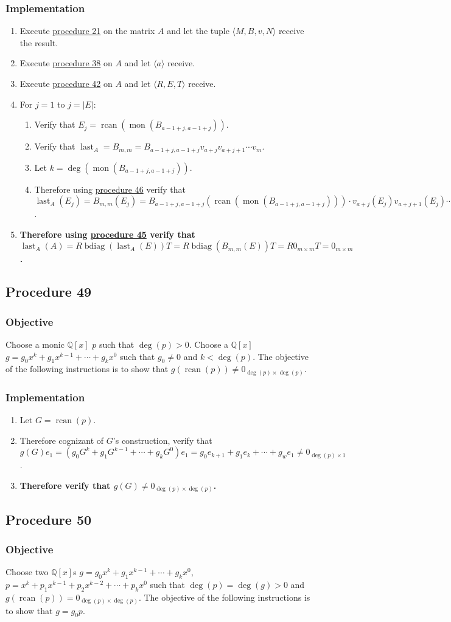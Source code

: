 \documentclass[twocolumn]{article}
\DeclareMathOperator{\bdiag}{bdiag}
\DeclareMathOperator{\rcan}{rcan}
\DeclareMathOperator{\mon}{mon}
\DeclareMathOperator{\last}{last}
\newcommand{\procedure}[2][]{\subsection*{Procedure #2 \ifthenelse{\equal{#1}{}}{}{(#1)}}\label{sec:procedure #2}}
\newcommand{\objective}{\subsubsection*{Objective}}
\newcommand{\implementation}{\subsubsection*{Implementation}}
\begin{document}
			\implementation
				\begin{enumerate}
					\item Execute \hyperref[sec:procedure 21]{procedure 21} on the matrix $A$ and let the tuple $\langle M,B,v,N\rangle$ receive the result.
					\item Execute \hyperref[sec:procedure 38]{procedure 38} on $A$ and let $\langle a\rangle$ receive.
					\item Execute \hyperref[sec:procedure 42]{procedure 42} on $A$ and let $\langle R,E,T\rangle$ receive.
					\item For $j=1$ to $j=\lvert E\rvert$:
					\begin{enumerate}
						\item Verify that $E_j=\rcan(\mon(B_{a-1+j,a-1+j}))$.
						\item Verify that $\last_A=B_{m,m}=B_{a-1+j,a-1+j}v_{a+j}v_{a+j+1}\cdots v_m$.
						\item Let $k=\deg(\mon(B_{a-1+j,a-1+j}))$.
						\item Therefore using \hyperref[sec:procedure 46]{procedure 46} verify that $\last_A(E_j)=B_{m,m}(E_j)=B_{a-1+j,a-1+j}(\rcan(\mon(B_{a-1+j,a-1+j})))\cdot v_{a+j}(E_j)v_{a+j+1}(E_j)\cdots v_m(E_j)=0_{k\times k}v_{a+j}(E_j)v_{a+j+1}(E_j)\cdots v_m(E_j)=0_{k\times k}$.
					\end{enumerate}
					\item \textbf{Therefore using \hyperref[sec:procedure 45]{procedure 45} verify that $\last_A(A)=R\bdiag(\last_A(E))T=R\bdiag(B_{m,m}(E))T=R0_{m\times m}T=0_{m\times m}$.}
				\end{enumerate}
		\procedure{49}
			\objective
				Choose a monic $\mathbb{Q}[x]$ $p$ such that $\deg(p)>0$. Choose a $\mathbb{Q}[x]$ $g=g_0x^k+g_1x^{k-1}+\cdots+g_kx^0$ such that $g_0\ne 0$ and $k<\deg(p)$. The objective of the following instructions is to show that $g(\rcan(p))\ne 0_{\deg(p)\times \deg(p)}$.
			\implementation
				\begin{enumerate}
					\item Let $G=\rcan(p)$.
					\item Therefore cognizant of $G$'s construction, verify that $g(G)e_1=(g_0G^k+g_1G^{k-1}+\cdots+g_kG^0)e_1=g_0e_{k+1}+g_1e_k+\cdots+g_we_1\ne 0_{\deg(p)\times 1}$.
					\item \textbf{Therefore verify that $g(G)\ne 0_{\deg(p)\times \deg(p)}$.}
				\end{enumerate}
		\procedure{50}
			\objective
				Choose two $\mathbb{Q}[x]$s $g=g_0x^k+g_1x^{k-1}+\cdots+g_kx^0$, $p=x^k+p_1x^{k-1}+p_2x^{k-2}+\cdots+p_kx^0$ such that $\deg(p)=\deg(g)>0$ and $g(\rcan(p))=0_{\deg(p)\times\deg(p)}$. The objective of the following instructions is to show that $g=g_0p$.
\end{document}
